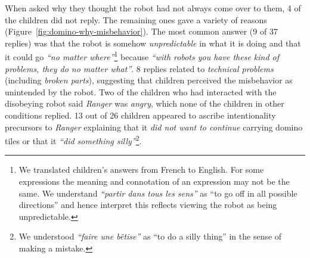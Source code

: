\documentclass[letterpaper, 10pt, conference]{ieeeconf}
\newcommand{\eg}{{\textit{e.g.~}}}
\begin{document}
When asked why they thought the robot had not always come over to them, 4 of the
children did not reply. The remaining ones gave a variety of reasons
(Figure~\ref{fig:domino-why-misbehavior}). The most common answer (9 of 37
replies) was that the robot is somehow \textit{unpredictable} in what it is
doing and that it could go \textit{``no matter where''}\footnote{We translated
children's answers from French to English. For some expressions the meaning
and connotation of an expression may not be the same. We understand
\textit{``partir dans tous les sens''} as ``to go off in all possible
directions'' and hence interpret this reflects viewing the robot as being
unpredictable.} because \textit{``with robots you have these kind of problems,
they do no matter what''}. 8 replies related to \textit{technical problems}
(including \textit{broken parts}), suggesting that children perceived the
misbehavior as unintended by the robot. Two of the children who had interacted
with the disobeying robot said \emph{Ranger} was \textit{angry}, which none of
the children in other conditions replied. 13 out of 26 children appeared to
ascribe intentionality precursors to \emph{Ranger} explaining that it
\textit{did not want to continue} carrying domino tiles or that it \textit{``did
something silly''}\footnote{We understood \textit{``faire une bêtise''} as ``to
do a silly thing'' in the sense of making a mistake.}.


\end{document}

